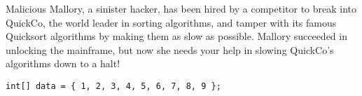 \begin{blocksection}
Malicious Mallory, a sinister hacker, has been hired by a competitor to break
into QuickCo, the world leader in sorting algorithms, and tamper with its
famous Quicksort algorithms by making them as slow as possible. Mallory
succeeded in unlocking the mainframe, but now she needs your help in slowing
QuickCo's algorithms down to a halt!

\begin{lstlisting}
int[] data = { 1, 2, 3, 4, 5, 6, 7, 8, 9 };
\end{lstlisting}
\end{blocksection}
